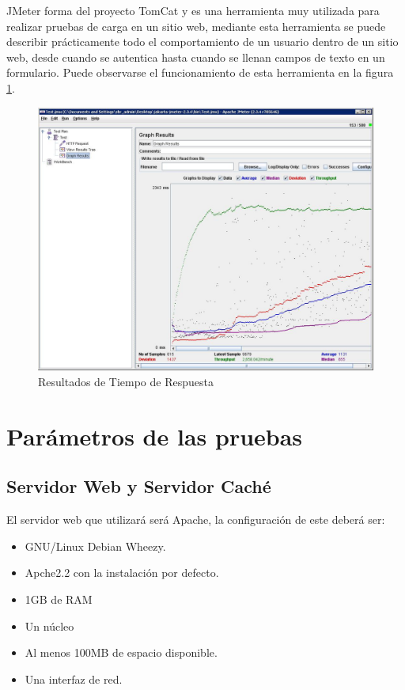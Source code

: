JMeter forma del proyecto TomCat y es una herramienta muy utilizada para realizar pruebas de carga en un sitio web, mediante esta herramienta se puede describir prácticamente todo el comportamiento de un usuario dentro de un sitio web, desde cuando se autentica hasta cuando se llenan campos de texto en un formulario. Puede observarse el funcionamiento de esta herramienta en la figura \ref{jmeter}.

\begin{figure}[h]
  \centering
    \includegraphics[scale=0.4]{gfx/jmeter}
  \caption{Resultados de Tiempo de Respuesta}
  \label{jmeter}
\end{figure}




\section{Parámetros de las pruebas}

\subsection{Servidor Web y Servidor Caché}
El servidor web que utilizará será Apache, la configuración de este deberá ser:

\begin{itemize}
\item GNU/Linux Debian Wheezy.
\item Apche2.2 con la instalación por defecto.
\item 1GB de RAM 
\item Un núcleo
\item Al menos 100MB de espacio disponible.
\item Una interfaz de red.
\end{itemize}

